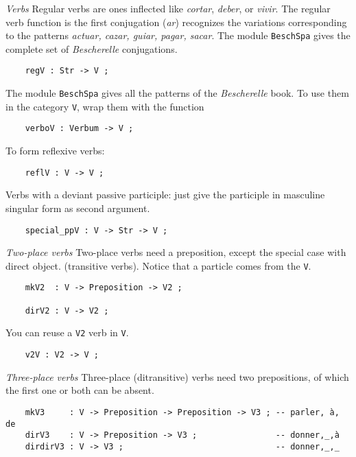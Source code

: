 \documentclass[11pt,a4paper]{article}
\newcommand{\subsubsubsection}[1]{\textit{#1}}
\begin{document}
\subsubsubsection{Verbs}
Regular verbs are ones inflected like \textit{cortar}, \textit{deber}, or \textit{vivir}.
The regular verb function is the first conjugation (\textit{ar}) recognizes
the variations corresponding to the patterns
\textit{actuar, cazar, guiar, pagar, sacar}. The module \texttt{BeschSpa} gives
the complete set of \textit{Bescherelle} conjugations.

\begin{verbatim}
    regV : Str -> V ;
\end{verbatim}

The module \texttt{BeschSpa} gives all the patterns of the \textit{Bescherelle}
book. To use them in the category \texttt{V}, wrap them with the function

\begin{verbatim}
    verboV : Verbum -> V ;
\end{verbatim}

To form reflexive verbs:

\begin{verbatim}
    reflV : V -> V ;
\end{verbatim}

Verbs with a deviant passive participle: just give the participle
in masculine singular form as second argument.

\begin{verbatim}
    special_ppV : V -> Str -> V ; 
\end{verbatim}

\subsubsubsection{Two-place verbs}
Two-place verbs need a preposition, except the special case with direct object.
(transitive verbs). Notice that a particle comes from the \texttt{V}.

\begin{verbatim}
    mkV2  : V -> Preposition -> V2 ;
  
    dirV2 : V -> V2 ;
\end{verbatim}

You can reuse a \texttt{V2} verb in \texttt{V}.

\begin{verbatim}
    v2V : V2 -> V ;
\end{verbatim}

\subsubsubsection{Three-place verbs}
Three-place (ditransitive) verbs need two prepositions, of which
the first one or both can be absent.

\begin{verbatim}
    mkV3     : V -> Preposition -> Preposition -> V3 ; -- parler, à, de
    dirV3    : V -> Preposition -> V3 ;                -- donner,_,à
    dirdirV3 : V -> V3 ;                               -- donner,_,_
\end{verbatim}
\end{document}
